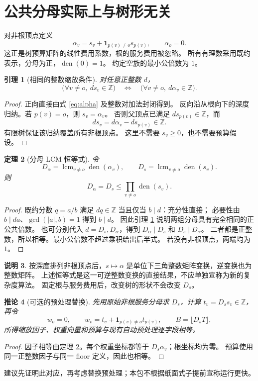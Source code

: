 \documentclass[UTF8,11pt,a4paper]{ctexart}
\newtheorem{theorem}{定理}[section]
\newtheorem{lemma}[theorem]{引理}
\newtheorem{corollary}[theorem]{推论}
\theoremstyle{definition}
\newtheorem{remark}[theorem]{说明}
\newcommand{\Z}{\mathbb Z}
\newcommand{\den}{\operatorname{den}}
\newcommand{\lcmop}{\operatorname{lcm}}
\newcommand{\abs}[1]{\left|#1\right|}
\begin{document}
\section{公共分母实际上与树形无关}
对非根顶点定义
\begin{equation}\label{eq:alpha}
 \alpha_v=s_v+\mathbf1_{p(v)\ne o}s_{p(v)},\qquad \alpha_o=0.
\end{equation}
这正是树预算矩阵的线性费用系数，根的服务费用被忽略。
所有有理数采用既约表示，分母为正，$\den(0)=1$。
约定空族的最小公倍数为 $1$。

\begin{lemma}[相同的整数缩放条件]\label{lem:scale}
对任意正整数 $d$，
\[
 \bigl(\forall v\ne o,\ ds_v\in\Z\bigr)
 \quad\Longleftrightarrow\quad
 \bigl(\forall v\ne o,\ d\alpha_v\in\Z\bigr).
\]
\end{lemma}
\begin{proof}
正向直接由式 \eqref{eq:alpha} 及整数对加法封闭得到。
反向沿从根向下的深度归纳。若 $p(v)=o$，则 $s_v=\alpha_v$。
否则父顶点已满足 $ds_{p(v)}\in\Z$，而
\[
 ds_v=d\alpha_v-ds_{p(v)}\in\Z.
\]
有限树保证该归纳覆盖所有非根顶点。
这里不需要 $s_v\ge0$，也不需要预算假设。
\end{proof}

\begin{theorem}[分母 LCM 恒等式]\label{thm:lcm}
令
\[
 D_\alpha=\lcmop_{v\ne o}\den(\alpha_v),\qquad
 D_s=\lcmop_{v\ne o}\den(s_v).
\]
则
\begin{equation}\label{eq:lcm}
 \boxed{D_\alpha=D_s\le\prod_{v\ne o}\den(s_v).}
\end{equation}
\end{theorem}
\begin{proof}
既约分数 $q=a/b$ 满足 $dq\in\Z$ 当且仅当 $b\mid d$：充分性直接；
必要性由 $b\mid da$、$\gcd(\abs a,b)=1$ 得到 $b\mid d$。
因此引理 \ref{lem:scale} 说明两组分母具有完全相同的正公共倍数。
也可分别代入 $d=D_s,D_\alpha$，得到 $D_\alpha\mid D_s$ 和 $D_s\mid D_\alpha$。
二者都是正整数，所以相等。最小公倍数不超过乘积给出后半式。
若没有非根顶点，两端均为 $1$。
\end{proof}

\begin{remark}
按深度排列非根顶点后，$s\mapsto\alpha$ 是单位下三角整数矩阵变换，逆变换也为整数矩阵。
上述恒等式是这一可逆整数变换的直接结果，不应单独宣称为新的复杂度算法。
固定根与服务费用后，改变树的形状不会改变 $D_s$。
\end{remark}

\begin{corollary}[可选的预处理替换]
先用原始非根服务分母求 $D_s$，计算 $t_v=D_s s_v\in\Z$，再令
\[
 w_o=0,\qquad w_v=t_v+\mathbf1_{p(v)\ne o}t_{p(v)},\qquad
 B=\lfloor D_s T\rfloor,
\]
所得缩放因子、权重向量和预算与现有自动预处理逐字段相等。
\end{corollary}
\begin{proof}
因子相等由定理 \ref{thm:lcm}。每个权重坐标都等于 $D_s\alpha_v$；根坐标均为零。
预算使用同一正整数因子与同一 floor 定义，因此也相等。
\end{proof}
建议先证明此对应，再考虑替换预处理；本包不根据纸面式子提前宣称运行更快。
\end{document}
